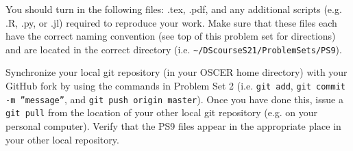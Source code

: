 \documentclass[12pt,english]{exam}
\begin{document}
\begin{questions}
\question You should turn in the following files: .tex, .pdf, and any additional scripts (e.g. .R, .py, or .jl) required to reproduce your work.  Make sure that these files each have the correct naming convention (see top of this problem set for directions) and are located in the correct directory (i.e. \texttt{\textasciitilde/DScourseS21/ProblemSets/PS9}).

\question Synchronize your local git repository (in your OSCER home directory) with your GitHub fork by using the commands in Problem Set 2 (i.e. \texttt{git add}, \texttt{git commit -m ''message''}, and \texttt{git push origin master}). Once you have done this, issue a \texttt{git pull} from the location of your other local git repository (e.g. on your personal computer). Verify that the PS9 files appear in the appropriate place in your other local repository.

\end{questions}
\end{document}
